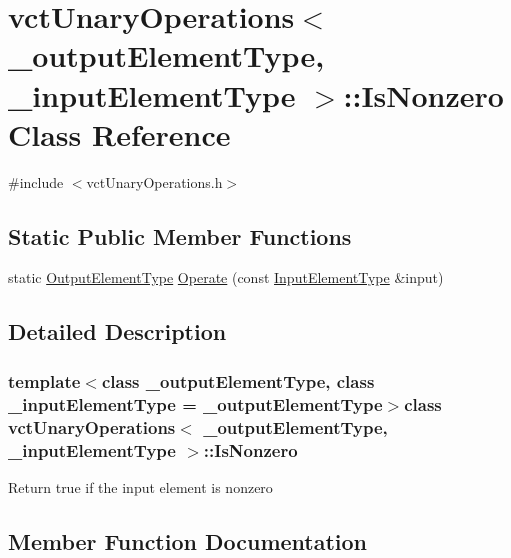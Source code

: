 \hypertarget{classvct_unary_operations_1_1_is_nonzero}{}\section{vct\+Unary\+Operations$<$ \+\_\+output\+Element\+Type, \+\_\+input\+Element\+Type $>$\+:\+:Is\+Nonzero Class Reference}
\label{classvct_unary_operations_1_1_is_nonzero}


{\ttfamily \#include $<$vct\+Unary\+Operations.\+h$>$}

\subsection*{Static Public Member Functions}
\begin{DoxyCompactItemize}
\item 
static \hyperlink{classvct_unary_operations_a42306ac3dd20d32c6d6c66ac3fa2e7b9}{Output\+Element\+Type} \hyperlink{classvct_unary_operations_1_1_is_nonzero_a5ba07619b5ac86c36518c768a218ad41}{Operate} (const \hyperlink{classvct_unary_operations_abf3b77bb7b8abd7ba72a6a45a65696a7}{Input\+Element\+Type} \&input)
\end{DoxyCompactItemize}


\subsection{Detailed Description}
\subsubsection*{template$<$class \+\_\+output\+Element\+Type, class \+\_\+input\+Element\+Type = \+\_\+output\+Element\+Type$>$class vct\+Unary\+Operations$<$ \+\_\+output\+Element\+Type, \+\_\+input\+Element\+Type $>$\+::\+Is\+Nonzero}

Return true if the input element is nonzero 

\subsection{Member Function Documentation}
\hypertarget{classvct_unary_operations_1_1_is_nonzero_a5ba07619b5ac86c36518c768a218ad41}{}
